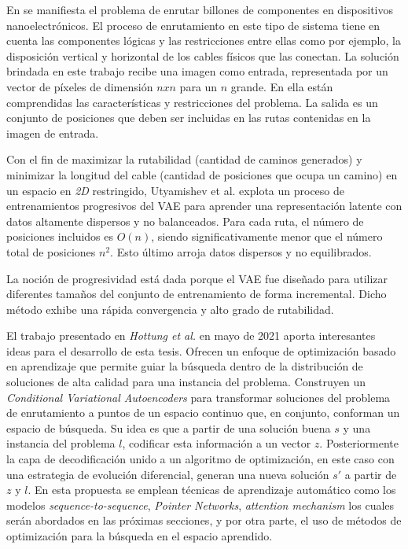 
En \cite{VAESparseData} se manifiesta el problema de enrutar billones de componentes en dispositivos nanoelectrónicos. El proceso de enrutamiento en este tipo de sistema tiene en cuenta las componentes lógicas y las restricciones entre ellas como por ejemplo, la disposición vertical y horizontal de los cables físicos que las conectan. La solución brindada en este trabajo recibe una imagen como entrada, representada por un vector de píxeles de dimensión $nxn$ para un $n$ grande. En ella están comprendidas las características y restricciones del problema. La salida es un conjunto de posiciones que deben ser incluidas en las rutas contenidas en la imagen de entrada. 

Con el fin de maximizar la rutabilidad (cantidad de caminos generados) y minimizar la longitud del cable (cantidad de posiciones que ocupa un camino) en un espacio en \textit{2D} restringido, Utyamishev et al. \cite{VAESparseData} explota un proceso de entrenamientos progresivos del VAE para aprender una representación latente con datos altamente dispersos y no balanceados. Para cada ruta, el número de posiciones incluidos es $O(n)$, siendo significativamente menor que el número total de posiciones $n^2$. Esto último arroja datos dispersos y no equilibrados.

La noción de progresividad está dada porque el VAE fue diseñado para utilizar diferentes tamaños del conjunto de entrenamiento de forma incremental. Dicho método exhibe una rápida convergencia y alto grado de rutabilidad.

El trabajo presentado en \textit{Hottung et al.} \cite{HottungBT21} en mayo de 2021 aporta interesantes ideas para el desarrollo de esta tesis. Ofrecen un enfoque de optimización basado en aprendizaje que permite guiar la búsqueda dentro de la distribución de soluciones de alta calidad para una instancia del problema. Construyen un \textit{Conditional Variational Autoencoders} para transformar soluciones del problema de enrutamiento a puntos de un espacio continuo que, en conjunto, conforman un espacio de búsqueda. Su idea es que a partir de una solución buena $s$ y una instancia del problema $l$, codificar esta información a un vector $z$. Posteriormente la capa de decodificación unido a un algoritmo de optimización, en este caso con una estrategia de evolución diferencial, generan una nueva solución $s'$ a partir de $z$ y $l$. En esta propuesta se emplean técnicas de aprendizaje automático como los modelos \textit{sequence-to-sequence}, \textit{Pointer Networks}, \textit{attention mechanism} los cuales serán abordados en las próximas secciones, y por otra parte, el uso de métodos de optimización para la búsqueda en el espacio aprendido. 



